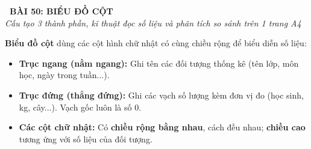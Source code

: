 \documentclass[14pt,a4paper,oneside]{extbook}
\begin{document}
\noindent
\begin{tcolorbox}[
  enhanced,
  colback=teal!8!white,
  colframe=teal!80!black,
  arc=3mm, boxrule=1pt,
  left=3mm, right=3mm, top=2mm, bottom=2mm,
  halign=center
]
  {\Large\bfseries\color{teal!90!black}\faBookmark\ BÀI 50: BIỂU ĐỒ CỘT}\\[1.5pt]
  {\footnotesize\itshape\color{black!75} Cấu tạo 3 thành phần, kĩ thuật đọc số liệu và phân tích so sánh trên 1 trang A4}
\end{tcolorbox}

\vspace{-2.5mm}

\noindent
\begin{minipage}[t]{0.49\textwidth}\vspace{0pt}
\begin{tcolorbox}[
  enhanced,
  colback=blue!4!white,
  colframe=blue!75!black,
  arc=2mm, boxrule=0.8pt,
  left=2mm, right=2mm, top=1.8mm, bottom=1.8mm,
  title={\footnotesize\bfseries\color{white}\faBarChart\ 1. Cấu tạo của biểu đồ cột}
]
{\footnotesize
\textbf{Biểu đồ cột} dùng các cột hình chữ nhật có cùng chiều rộng để biểu diễn số liệu:
\begin{itemize}\setlength{\itemsep}{1pt}\setlength{\leftskip}{-2.5mm}
  \item \textbf{Trục ngang (nằm ngang):} Ghi tên các đối tượng thống kê (tên lớp, môn học, ngày trong tuần...).
  \item \textbf{Trục đứng (thẳng đứng):} Ghi các vạch số lượng kèm đơn vị đo (học sinh, kg, cây...). Vạch gốc luôn là số $0$.
  \item \textbf{Các cột chữ nhật:} Có \textbf{chiều rộng bằng nhau}, cách đều nhau; \textbf{chiều cao} tương ứng với số liệu của đối tượng.
\end{itemize}
}
\end{tcolorbox}
\end{minipage}
\hfill
\end{document}
